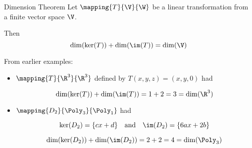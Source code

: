 \documentclass{beamer}
\begin{document}
\begin{frame}
\onslide<+->
\begin{block}{Dimension Theorem}
Let $\mapping{T}{\V}{\W}$ be a linear transformation from a finite vector space $\V$.

\vspace{2mm}
Then
\begin{equation*}
\dim(\ker(T))+\dim(\im(T))=\dim(\V)
\end{equation*}
\end{block}
\onslide<+->
\begin{example}
From earlier examples:
\begin{itemize}[<+->]
\item $\mapping{T}{\R^3}{\R^3}$ defined by $T(x,y,z)=(x,y,0)$ had

\vspace{-3mm}
\begin{equation*}
\dim(\ker(T))+\dim(\im(T))=1+2=3=\dim(\R^3)
\end{equation*}
\item $\mapping{D_2}{\Poly_3}{\Poly_1}$ had

\vspace{-3mm}
\begin{equation*}
\ker(D_2)=\{cx+d\}
\quad\text{and}\quad
\im(D_2)=\{6ax+2b\}
\end{equation*}

\vspace{-3mm}
\begin{equation*}
\dim(\ker(D_2))+\dim(\im(D_2))=2+2=4=\dim(\Poly_3)
\end{equation*}
\end{itemize}
\end{example}
\end{frame}
\end{document}

